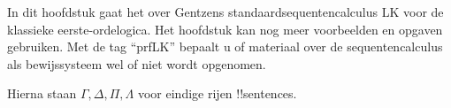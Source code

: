 \documentclass[openany]{memoir}
\begin{document}
\begingroup
\def\olfilename{OLP-0069}
\def\olfilepath{content/first-order-logic/sequent-calculus/}
\hypertarget{unit-OLP-0069}{}



      {}
      {}

\begin{editorial}
  In dit hoofdstuk gaat het over Gentzens standaardsequentencalculus LK
  voor de klassieke eerste-ordelogica. Het hoofdstuk kan nog meer
  voorbeelden en opgaven gebruiken. Met de tag ``prfLK'' bepaalt u of
  materiaal over de sequentencalculus als bewijssysteem wel of niet
  wordt opgenomen.
\end{editorial}













\endgroup

\begingroup
\def\olfilename{OLP-0070}
\def\olfilepath{content/first-order-logic/sequent-calculus/}
\hypertarget{unit-OLP-0070}{}



      {}
      {}


Hierna staan $\Gamma, \Delta, \Pi, \Lambda$ voor eindige rijen
!!{sentence}s.
\end{document}
